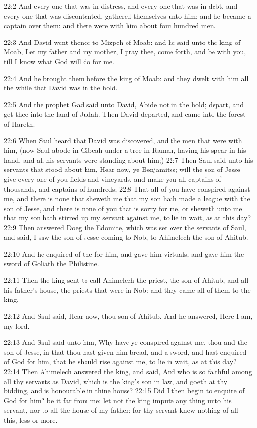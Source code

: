 22:2 And every one that was in distress, and every one that was in
debt, and every one that was discontented, gathered themselves unto
him; and he became a captain over them: and there were with him about
four hundred men.

22:3 And David went thence to Mizpeh of Moab: and he said unto the
king of Moab, Let my father and my mother, I pray thee, come forth,
and be with you, till I know what God will do for me.

22:4 And he brought them before the king of Moab: and they dwelt with
him all the while that David was in the hold.

22:5 And the prophet Gad said unto David, Abide not in the hold;
depart, and get thee into the land of Judah. Then David departed, and
came into the forest of Hareth.

22:6 When Saul heard that David was discovered, and the men that were
with him, (now Saul abode in Gibeah under a tree in Ramah, having his
spear in his hand, and all his servants were standing about him;) 22:7
Then Saul said unto his servants that stood about him, Hear now, ye
Benjamites; will the son of Jesse give every one of you fields and
vineyards, and make you all captains of thousands, and captains of
hundreds; 22:8 That all of you have conspired against me, and there is
none that sheweth me that my son hath made a league with the son of
Jesse, and there is none of you that is sorry for me, or sheweth unto
me that my son hath stirred up my servant against me, to lie in wait,
as at this day?  22:9 Then answered Doeg the Edomite, which was set
over the servants of Saul, and said, I saw the son of Jesse coming to
Nob, to Ahimelech the son of Ahitub.

22:10 And he enquired of the \LORD for him, and gave him victuals, and
gave him the sword of Goliath the Philistine.

22:11 Then the king sent to call Ahimelech the priest, the son of
Ahitub, and all his father's house, the priests that were in Nob: and
they came all of them to the king.

22:12 And Saul said, Hear now, thou son of Ahitub. And he answered,
Here I am, my lord.

22:13 And Saul said unto him, Why have ye conspired against me, thou
and the son of Jesse, in that thou hast given him bread, and a sword,
and hast enquired of God for him, that he should rise against me, to
lie in wait, as at this day?  22:14 Then Ahimelech answered the king,
and said, And who is so faithful among all thy servants as David,
which is the king's son in law, and goeth at thy bidding, and is
honourable in thine house?  22:15 Did I then begin to enquire of God
for him? be it far from me: let not the king impute any thing unto his
servant, nor to all the house of my father: for thy servant knew
nothing of all this, less or more.

